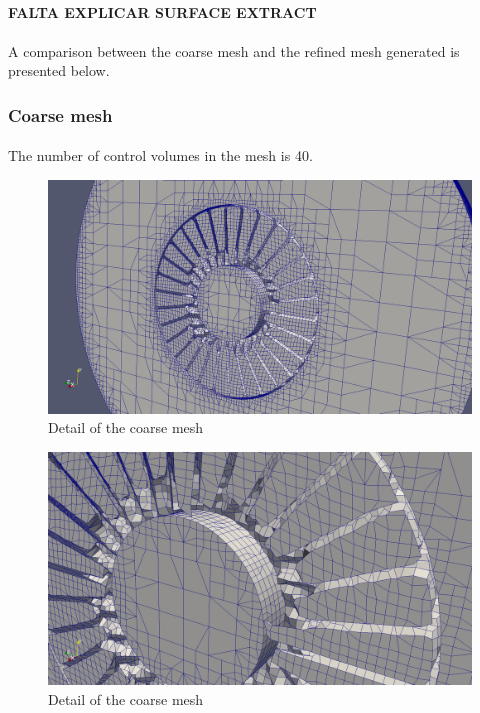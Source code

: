 \paragraph{}\textbf{FALTA EXPLICAR SURFACE EXTRACT}

\paragraph{}A comparison between the coarse mesh and the refined mesh generated is presented below.

\subsubsection{Coarse mesh}
\paragraph{}The number of control volumes in the mesh is 40.

\begin{figure}[h!]
\includegraphics[scale=0.26]{./mesh/screenshots/coarse2}
\centering
\caption{Detail of the coarse mesh}
\end{figure}

\begin{figure}[h!]
\includegraphics[scale=0.26]{./mesh/screenshots/coarse3}
\centering
\caption{Detail of the coarse mesh}
\end{figure}

